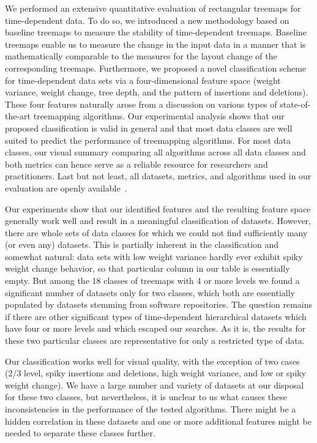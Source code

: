 We performed an extensive quantitative evaluation of rectangular treemaps for time-dependent data. To do so, we introduced a new methodology based on baseline treemaps to measure the stability of time-dependent treemaps. Baseline treemaps enable us to measure the change in the input data in a manner that is mathematically comparable to the measures for the layout change of the corresponding treemaps. Furthermore, we proposed a novel classification scheme for time-dependent data sets via a four-dimensional feature space (weight variance, weight change, tree depth, and the pattern of insertions and deletions). These four features naturally arose from a discussion on various types of state-of-the-art treemapping algorithms. Our experimental analysis shows that our proposed classification is valid in general and that most data classes are well suited to predict the performance of treemapping algorithms. For most data classes, our visual summary comparing all algorithms across all data classes and both metrics can hence serve as a reliable resource for researchers and practitioners. Last but not least, all datasets, metrics, and algorithms used in our evaluation are openly available~\citep{URLTreemaps}.

 Our experiments show that our identified features and the resulting feature space generally work well and result in a meaningful classification of datasets. However, there are whole sets of data classes for which we could not find sufficiently many (or even any) datasets. This is partially inherent in the classification and somewhat natural: data sets with low weight variance hardly ever exhibit spiky weight change behavior, so that particular column in our table is essentially empty. But among the 18 classes of treemaps with 4 or more levels we found a significant number of datasets only for two classes, which both are essentially populated by datasets stemming from software repositories. The question remains if there are other significant types of time-dependent hierarchical datasets which have four or more levels and which escaped our searches. As it is, the results for these two particular classes are representative for only a restricted type of data.

Our classification works well for visual quality, with the exception of two cases (2/3 level, spiky insertions and deletions, high weight variance, and low or spiky weight change). We have a large number and variety of datasets at our disposal for these two classes, but nevertheless, it is unclear to us what causes these inconsistencies in the performance of the tested algorithms. There might be a hidden correlation in these datasets and one or more additional features might be needed to separate these classes further.

